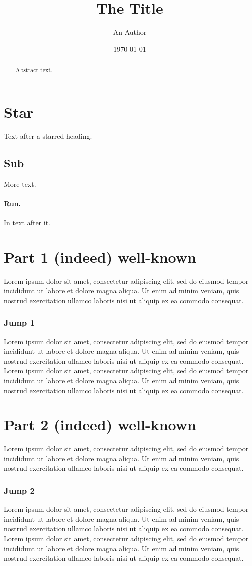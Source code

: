 \documentclass{article}
\title{The Title}
\author{An Author}
\date{\today}
\begin{document}
\maketitle
\begin{abstract}
Abstract text.
\end{abstract}
\section*{Star}\label{st}
Text after a starred heading.
\subsection{Sub}
More text.
\paragraph{Run.} In text \label{r}after it.
\section{Part 1 (indeed) well-known}\label{s1}
Lorem ipsum dolor sit amet, consectetur adipiscing elit, sed do eiusmod tempor incididunt ut labore et dolore magna aliqua. Ut enim ad minim veniam, quis nostrud exercitation ullamco laboris nisi ut aliquip ex ea commodo consequat.

\subsubsection{Jump 1}
Lorem ipsum dolor sit amet, consectetur adipiscing elit, sed do eiusmod tempor incididunt ut labore et dolore magna aliqua. Ut enim ad minim veniam, quis nostrud exercitation ullamco laboris nisi ut aliquip ex ea commodo consequat. Lorem ipsum dolor sit amet, consectetur adipiscing elit, sed do eiusmod tempor incididunt ut labore et dolore magna aliqua. Ut enim ad minim veniam, quis nostrud exercitation ullamco laboris nisi ut aliquip ex ea commodo consequat.

\section{Part 2 (indeed) well-known}\label{s2}
Lorem ipsum dolor sit amet, consectetur adipiscing elit, sed do eiusmod tempor incididunt ut labore et dolore magna aliqua. Ut enim ad minim veniam, quis nostrud exercitation ullamco laboris nisi ut aliquip ex ea commodo consequat.

\subsubsection{Jump 2}
Lorem ipsum dolor sit amet, consectetur adipiscing elit, sed do eiusmod tempor incididunt ut labore et dolore magna aliqua. Ut enim ad minim veniam, quis nostrud exercitation ullamco laboris nisi ut aliquip ex ea commodo consequat. Lorem ipsum dolor sit amet, consectetur adipiscing elit, sed do eiusmod tempor incididunt ut labore et dolore magna aliqua. Ut enim ad minim veniam, quis nostrud exercitation ullamco laboris nisi ut aliquip ex ea commodo consequat.
\end{document}
